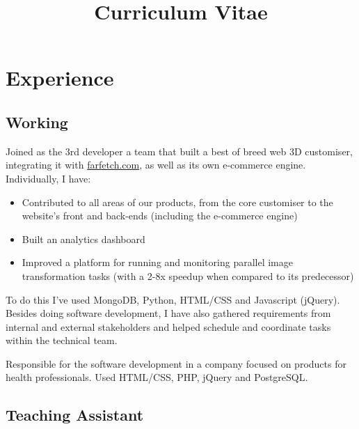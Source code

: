 \documentclass[11pt,a4paper]{moderncv}
\title{Curriculum Vitae}
\begin{document}
\maketitle

\vspace{-10mm}

\section{Experience}
\vspace{-2mm}
\subsection{Working}
{Joined as the 3rd developer a team that built a best of breed web 3D customiser,
integrating it with \href{https://www.farfetch.com/}{farfetch.com}, as well as
its own e-commerce engine. Individually, I have:
\begin{itemize}
  \item Contributed to all areas of our products, from the core
  customiser to the website's front and back-ends (including the e-commerce engine)
  \item Built an analytics dashboard
  \item Improved a platform for running and monitoring parallel image transformation tasks
  (with a 2-8x speedup when compared to its predecessor)
\end{itemize}
To do this I've used MongoDB, Python, HTML/CSS and Javascript (jQuery).
\newline Besides doing software development, I have also gathered requirements from internal and external
stakeholders and helped schedule and coordinate tasks within the technical team.
}
{Responsible for the software development in a company focused on products for
health professionals. Used HTML/CSS, PHP, jQuery and PostgreSQL.}
\vspace{2mm}
\subsection{Teaching Assistant}
\vspace{-3mm}
\end{document}
